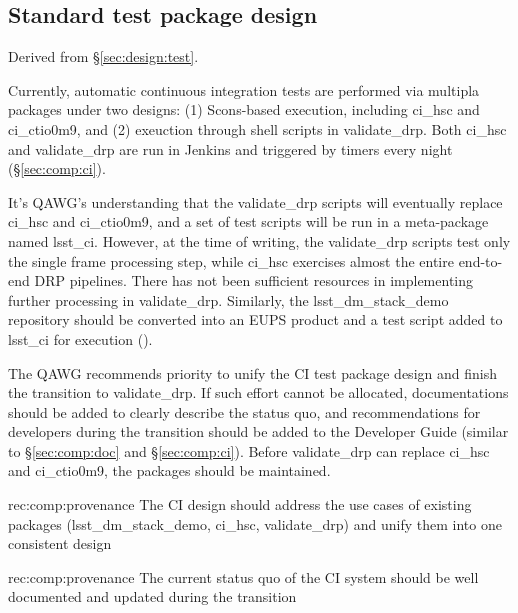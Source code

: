 \subsection{Standard test package design}
\label{sec:comp:test_pkg}

Derived from \S\ref{sec:design:test}.


Currently, automatic continuous integration tests are performed via
multipla packages under two designs: (1) Scons-based execution, including
ci\_hsc and ci\_ctio0m9, and (2) exeuction through shell scripts
in validate\_drp.  Both ci\_hsc and validate\_drp are run in
Jenkins and triggered by timers every night (\S\ref{sec:comp:ci}).

It's QAWG's understanding that the validate\_drp scripts will
eventually replace ci\_hsc and ci\_ctio0m9, and a set of test scripts
will be run in a meta-package named lsst\_ci.  However, at the time
of writing, the validate\_drp scripts test only the single frame
processing step, while ci\_hsc exercises almost the entire end-to-end
DRP pipelines.  There has not been sufficient resources in implementing
further processing in validate\_drp.  Similarly, the lsst\_dm\_stack\_demo
repository should be converted into an EUPS product and a test
script added to lsst\_ci for execution ().

The QAWG recommends priority to unify the CI test package design and
finish the transition to validate\_drp. If such effort cannot
be allocated, documentations should be added to clearly describe
the status quo, and recommendations for developers during the
transition should be added to the Developer Guide (similar to
\S\ref{sec:comp:doc} and \S\ref{sec:comp:ci}). Before validate\_drp
can replace ci\_hsc and ci\_ctio0m9, the packages should be maintained.


\begin{recommendation}
  {rec:comp:provenance}
  {The CI design should address the use cases of existing packages
   (lsst\_dm\_stack\_demo, ci\_hsc, validate\_drp) and unify them into
   one consistent design}
\end{recommendation}
\begin{recommendation}
  {rec:comp:provenance}
  {The current status quo of the CI system should be well documented
   and updated during the transition}
\end{recommendation}
